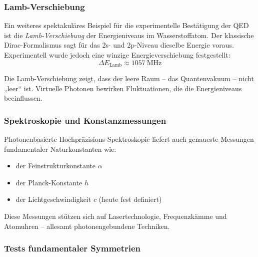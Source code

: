 \subsubsection{Lamb-Verschiebung}

Ein weiteres spektakuläres Beispiel für die experimentelle Bestätigung der QED ist die \emph{Lamb-Verschiebung} der Energieniveaus im Wasserstoffatom. Der klassische Dirac-Formalismus sagt für das 2s- und 2p-Niveau dieselbe Energie voraus. Experimentell wurde jedoch eine winzige Energieverschiebung festgestellt:
\[
\Delta E_\text{Lamb} \approx \SI{1057}{\mega\hertz}
\]
\vspace{0.5em}
\begin{tcolorbox}[didaktikbox,title=Warum ist das wichtig?]
	\label{box:Warum ist wichtig}
	Die Lamb-Verschiebung zeigt, dass der leere Raum – das Quantenvakuum – nicht „leer“ ist. Virtuelle Photonen bewirken Fluktuationen, die die Energieniveaus beeinflussen.
\end{tcolorbox}
\subsubsection{Spektroskopie und Konstanzmessungen}

Photonenbasierte Hochpräzisions-Spektroskopie liefert auch genaueste Messungen fundamentaler Naturkonstanten wie:

\begin{itemize}
	\item der Feinstrukturkonstante $\alpha$
	\item der Planck-Konstante $h$
	\item der Lichtgeschwindigkeit $c$ (heute fest definiert)
\end{itemize}

Diese Messungen stützen sich auf Lasertechnologie, Frequenzkämme und Atomuhren – allesamt photonengebundene Techniken.

\subsubsection{Tests fundamentaler Symmetrien}


